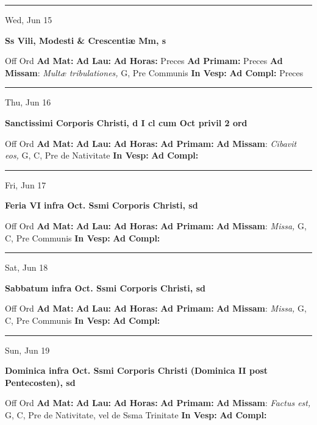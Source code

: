\documentclass[letterpaper, 10pt]{article}
\begin{document}
\hrule
\begin{center}
Wed, Jun 15
\end{center}\textbf{ \large Ss Vili, Modesti \& Crescentiæ Mm, \textnormal{\normalsize s}}
\begin{justify}
Off Ord
\textbf{Ad Mat: }
\textbf{Ad Lau: }
\textbf{Ad Horas: }Preces
\textbf{Ad Primam: }Preces
\textbf{Ad Missam}: \textit{Multæ tribulationes,} G, Pre Communis
\textbf{In Vesp: }
\textbf{Ad Compl: }Preces\end{justify}



\hrule
\begin{center}
Thu, Jun 16
\end{center}\textbf{ \large Sanctissimi Corporis Christi, \textnormal{\normalsize d I cl cum Oct privil 2 ord}}
\begin{justify}
Off Ord
\textbf{Ad Mat: }
\textbf{Ad Lau: }
\textbf{Ad Horas: }
\textbf{Ad Primam: }
\textbf{Ad Missam}: \textit{Cibavit eos,} G, C, Pre de Nativitate
\textbf{In Vesp: }
\textbf{Ad Compl: }\end{justify}



\hrule
\begin{center}
Fri, Jun 17
\end{center}\textbf{ \large Feria VI infra Oct. Ssmi Corporis Christi, \textnormal{\normalsize sd}}
\begin{justify}
Off Ord
\textbf{Ad Mat: }
\textbf{Ad Lau: }
\textbf{Ad Horas: }
\textbf{Ad Primam: }
\textbf{Ad Missam}: \textit{Missa,} G, C, Pre Communis
\textbf{In Vesp: }
\textbf{Ad Compl: }\end{justify}



\hrule
\begin{center}
Sat, Jun 18
\end{center}\textbf{ \large Sabbatum infra Oct. Ssmi Corporis Christi, \textnormal{\normalsize sd}}
\begin{justify}
Off Ord
\textbf{Ad Mat: }
\textbf{Ad Lau: }
\textbf{Ad Horas: }
\textbf{Ad Primam: }
\textbf{Ad Missam}: \textit{Missa,} G, C, Pre Communis
\textbf{In Vesp: }
\textbf{Ad Compl: }\end{justify}



\hrule
\begin{center}
Sun, Jun 19
\end{center}\textbf{ \large Dominica infra Oct. Ssmi Corporis Christi (Dominica II post Pentecosten), \textnormal{\normalsize sd}}
\begin{justify}
Off Ord
\textbf{Ad Mat: }
\textbf{Ad Lau: }
\textbf{Ad Horas: }
\textbf{Ad Primam: }
\textbf{Ad Missam}: \textit{Factus est,} G, C, Pre de Nativitate, vel de Ssma Trinitate
\textbf{In Vesp: }
\textbf{Ad Compl: }\end{justify}
\end{document}
